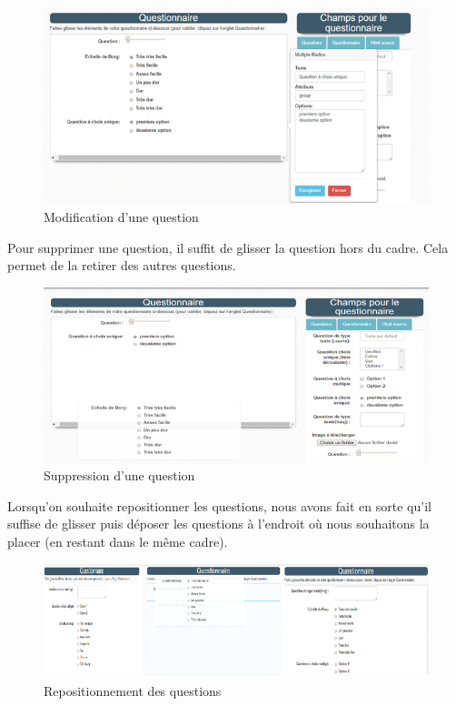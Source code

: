 \begin{figure}[H]
    \begin{center}
	\includegraphics[scale=0.8]{img/questionnaire/modification}
    \end{center}
    \caption{Modification d'une question}
\end{figure}
 
 
Pour supprimer une question, il suffit de glisser la question hors du cadre. Cela permet de la retirer des autres questions.


\begin{figure}[H]
    \begin{center}
	\includegraphics[scale=0.8]{img/questionnaire/suppresion}
    \end{center}
    \caption{Suppression d'une question}
\end{figure}


Lorsqu'on souhaite repositionner les questions, nous avons fait en sorte qu'il suffise de glisser puis déposer les questions à l'endroit où nous souhaitons la placer (en restant dans le même cadre).



\begin{figure}[H]
    \begin{center}
	\includegraphics[scale=0.8]{img/questionnaire/repositionnement}
    \end{center}
    \caption{Repositionnement des questions}
\end{figure}


